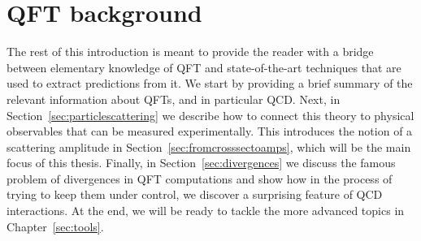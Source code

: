 \documentclass[main.tex]{subfiles}
\begin{document}
\section{QFT background} \label{sec:QFTintro}
The rest of this introduction is meant to provide the reader with a bridge between elementary knowledge of QFT and state-of-the-art techniques that are used to extract predictions from it. We start by providing a brief summary of the relevant information about QFTs, and in particular QCD. Next, in Section~\ref{sec:particlescattering} we describe how to connect this theory to physical observables that can be measured experimentally. This introduces the notion of a scattering amplitude in Section~\ref{sec:fromcrosssectoamps}, which will be the main focus of this thesis. Finally, in Section~\ref{sec:divergences} we discuss the famous problem of divergences in QFT computations and show how in the process of trying to keep them under control, we discover a surprising feature of QCD interactions. At the end, we will be ready to tackle the more advanced topics in Chapter~\ref{sec:tools}.
\end{document}
